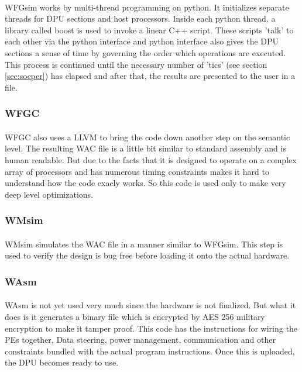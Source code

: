 \paragraph{}
WFGsim works by multi-thread programming on python. It initializes separate threads for DPU sections and host processors. Inside each python thread, a library called boost is used to invoke a linear C++ script. These scripts 'talk' to each other via the python interface and python interface also gives the DPU sections a sense of time by governing the order which operations are executed. This process is continued until the necessary number of 'tics' (see section \ref{sec:socper}) has elapsed and after that, the results are presented to the user in a file.

\subsubsection{WFGC}
\paragraph{}
WFGC also uses a LLVM to bring the code down another step on the semantic level. The resulting WAC file is a little bit similar to standard assembly and is human readable. But due to the facts that it is designed to operate on a complex array of processors and has numerous timing constraints makes it hard to understand how the code exacly works. So this code is used only to make very deep level optimizations.

\subsubsection{WMsim}
\paragraph{}
WMsim simulates the WAC file in a manner similar to WFGsim. This step is used to verify the design is bug free before loading it onto the actual hardware.

\subsubsection{WAsm}
\paragraph{}
WAsm is not yet used very much since the hardware is not finalized. But what it does is it generates a binary file which is encrypted by AES 256 military encryption to make it tamper proof. This code has the instructions for wiring the PEs together, Data steering, power management, communication and other constraints bundled with the actual program instructions. Once this is uploaded, the DPU becomes ready to use.

